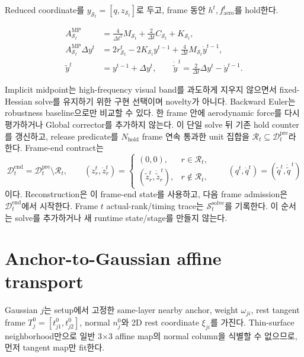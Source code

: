 \documentclass[11pt]{article}
\begin{document}
Reduced coordinate를 \(y_{\mathcal S_t}=[q,z_{\mathcal S_t}]\)로 두고,
frame 동안 \(h^t,f_{\mathrm{aero}}^t\)를 hold한다.

\begin{equation}
\begin{aligned}
  A_{\mathcal S_t}^{\mathrm{MP}}
  &=
  \frac{4}{\Delta t^2}M_{\mathcal S_t}
  +\frac{2}{\Delta t}C_{\mathcal S_t}
  +K_{\mathcal S_t},\\
  A_{\mathcal S_t}^{\mathrm{MP}}\Delta y^t
  &=
  2r_{\mathcal S_t}^t
  -2K_{\mathcal S_t}y^{t-1}
  +\frac{4}{\Delta t}M_{\mathcal S_t}\dot y^{t-1},\\
  \widetilde y^t&=y^{t-1}+\Delta y^t,\qquad
  \dot{\widetilde y}^{\,t}
  =\frac{2}{\Delta t}\Delta y^t-\dot y^{t-1}.
\end{aligned}
  \label{eq:minimal-coupled-step}
\end{equation}

Implicit midpoint는 high-frequency visual band를 과도하게 지우지 않으면서
fixed-Hessian solve를 유지하기 위한 구현 선택이며 novelty가 아니다.
Backward Euler는 robustness baseline으로만 비교할 수 있다.
한 frame 안에 aerodynamic force를 다시 평가하거나 Global corrector를 추가하지 않는다.
이 단일 solve 뒤 기존 hold counter를 갱신하고, release predicate를
\(N_{\mathrm{hold}}\) frame 연속 통과한 unit 집합을
\(\mathcal R_t\subseteq\mathcal D_t^{\mathrm{pre}}\)라 한다. Frame-end contract는
\[
  \mathcal D_t^{\mathrm{end}}
  =\mathcal D_t^{\mathrm{pre}}\setminus\mathcal R_t,
  \qquad
  (z_r^t,\dot z_r^t)
  =
  \begin{cases}
    (0,0),&r\in\mathcal R_t,\\
    (\widetilde z_r^t,\dot{\widetilde z}_r^{\,t}),&r\notin\mathcal R_t,
  \end{cases}
  \qquad
  (q^t,\dot q^t)=(\widetilde q^t,\dot{\widetilde q}^{\,t})
\]
이다. Reconstruction은 이 frame-end state를 사용하고, 다음 frame admission은
\(\mathcal D_t^{\mathrm{end}}\)에서 시작한다. Frame \(t\) actual-rank/timing trace는
\(\mathcal S_t^{\mathrm{solve}}\)를 기록한다. 이 순서는 solve를 추가하거나 새 runtime state/stage를 만들지 않는다.

\section{Anchor-to-Gaussian affine transport}

Gaussian \(j\)는 setup에서 고정한 same-layer nearby anchor, weight \(\omega_{ji}\),
rest tangent frame \(T_j^0=[t_{j1}^0,t_{j2}^0]\), normal \(n_j^0\)와
2D rest coordinate \(\xi_{ji}\)를 가진다.
Thin-surface neighborhood만으로 일반 3\(\times\)3 affine map의 normal column을 식별할 수 없으므로,
먼저 tangent map만 fit한다.
\end{document}
